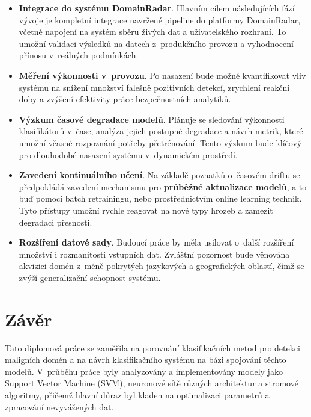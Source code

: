 \begin{itemize}
    \item \textbf{Integrace do systému DomainRadar}. Hlavním cílem následujících fází vývoje je kompletní integrace navržené pipeline do platformy DomainRadar, včetně napojení na systém sběru živých dat a uživatelského rozhraní. To umožní validaci výsledků na datech z~produkčního provozu a vyhodnocení přínosu v~reálných podmínkách.

    \item \textbf{Měření výkonnosti v~provozu}. Po nasazení bude možné kvantifikovat vliv systému na snížení množství falešně pozitivních detekcí, zrychlení reakční doby a zvýšení efektivity práce bezpečnostních analytiků.

    \item \textbf{Výzkum časové degradace modelů}. Plánuje se sledování výkonnosti klasifikátorů v~čase, analýza jejich postupné degradace a návrh metrik, které umožní včasné rozpoznání potřeby přetrénování. Tento výzkum bude klíčový pro dlouhodobé nasazení systému v~dynamickém prostředí.

    \item \textbf{Zavedení kontinuálního učení}. Na základě poznatků o~časovém driftu se předpokládá zavedení mechanismu pro \textbf{průběžné aktualizace modelů}, a to buď pomocí batch retrainingu, nebo prostřednictvím online learning technik. Tyto přístupy umožní rychle reagovat na nové typy hrozeb a zamezit degradaci přesnosti.

    \item \textbf{Rozšíření datové sady}. Budoucí práce by měla usilovat o~další rozšíření množství i rozmanitosti vstupních dat. Zvláštní pozornost bude věnována akvizici domén z~méně pokrytých jazykových a geografických oblastí, čímž se zvýší generalizační schopnost systému.
\end{itemize}



\chapter{Závěr}
\label{chapter:conclusion}

Tato diplomová práce se zaměřila na porovnání klasifikačních metod pro detekci maligních domén a na návrh klasifikačního systému na bázi spojování těchto modelů. V~průběhu práce byly analyzovány a implementovány modely jako Support Vector Machine (SVM), neuronové sítě různých architektur a stromové algoritmy, přičemž hlavní důraz byl kladen na optimalizaci parametrů a zpracování nevyvážených dat.

